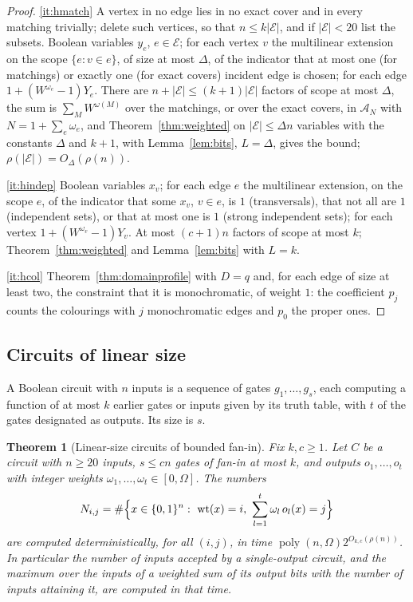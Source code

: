 \documentclass[11pt,reqno]{amsart}
\numberwithin{equation}{section}
\theoremstyle{plain}
\newtheorem{theorem}{Theorem}[section]
\theoremstyle{definition}
\theoremstyle{remark}
\DeclareMathOperator{\poly}{poly}
\newcommand{\A}{\mathcal{A}}
\newcommand{\rhon}{\rho}
\begin{document}
\begin{proof}
\ref{it:hmatch} A vertex in no edge lies in no exact cover and in every matching
trivially; delete such vertices, so that $n\le k|\mathcal E|$, and if
$|\mathcal E|<20$ list the subsets. Boolean variables $y_e$, $e\in\mathcal E$;
for each vertex $v$ the multilinear extension on the scope
$\{e:v\in e\}$, of size at most $\Delta$, of the indicator that at most one
(for matchings) or exactly one (for exact covers) incident edge is chosen; for
each edge $1+(W^{\omega_e}-1)Y_e$. There are $n+|\mathcal E|\le(k+1)|\mathcal E|$
factors of scope at most $\Delta$, the sum is
$\sum_M W^{\omega(M)}$ over the matchings, or over the exact covers, in $\A_N$
with $N=1+\sum_e\omega_e$, and Theorem~\ref{thm:weighted} on $|\mathcal E|\le\Delta n$
variables with the constants $\Delta$ and $k+1$, with Lemma~\ref{lem:bits},
$L=\Delta$, gives the bound; $\rhon(|\mathcal E|)=O_\Delta(\rhon(n))$.

\ref{it:hindep} Boolean variables $x_v$; for each edge $e$ the multilinear
extension, on the scope $e$, of the indicator that some $x_v$, $v\in e$, is $1$
(transversals), that not all are $1$ (independent sets), or that at most one
is $1$ (strong independent sets); for each vertex $1+(W^{\omega_v}-1)Y_v$. At most
$(c+1)n$ factors of scope at most $k$; Theorem~\ref{thm:weighted} and
Lemma~\ref{lem:bits} with $L=k$.

\ref{it:hcol} Theorem~\ref{thm:domainprofile} with $D=q$ and, for each edge of
size at least two, the constraint that it is monochromatic, of weight $1$: the
coefficient $p_j$ counts the colourings with $j$ monochromatic edges and $p_0$
the proper ones.
\end{proof}

\subsection{Circuits of linear size}\label{ssec:circuits}
A Boolean circuit with $n$ inputs is a sequence of gates $g_1,\dots,g_s$, each
computing a function of at most $k$ earlier gates or inputs given by its truth
table, with $t$ of the gates designated as outputs. Its size is $s$.

\begin{theorem}[Linear-size circuits of bounded fan-in]\label{thm:circuits}
Fix $k,c\ge1$. Let $C$ be a circuit with $n\ge20$ inputs, $s\le cn$ gates of
fan-in at most $k$, and outputs $o_1,\dots,o_t$ with integer weights
$\omega_1,\dots,\omega_t\in[0,\Omega]$. The numbers
\[
  N_{i,j}=\#\Bigl\{x\in\{0,1\}^n:\ \operatorname{wt}(x)=i,\ \sum_{l=1}^{t}\omega_l\,o_l(x)=j\Bigr\}
\]
are computed deterministically, for all $(i,j)$, in time
$\poly(n,\Omega)2^{O_{k,c}(\rhon(n))}$. In particular the number of inputs
accepted by a single-output circuit, and the maximum over the inputs of a
weighted sum of its output bits with the number of inputs attaining it, are
computed in that time.
\end{theorem}
\end{document}
